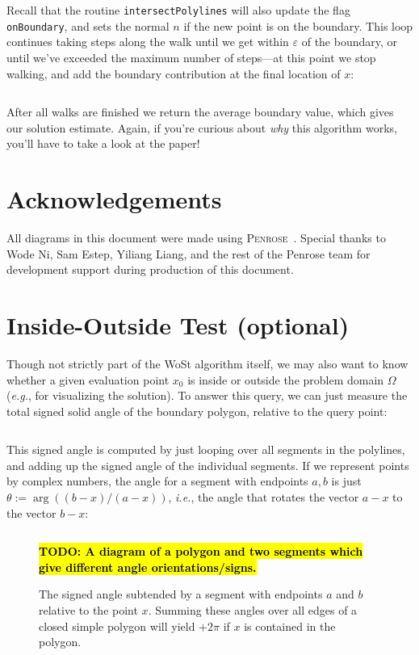 \documentclass{article}
\newcommand{\code}[1]{\texttt{\small{#1}}}
\newcommand{\todo}[1]{\textbf{\hl{TODO: #1}}}
\newcommand{\eg}{\emph{e.g.}} %
\newcommand{\ie}{\emph{i.e.}} %
\renewcommand{\vec}[1]{#1}
\begin{document}
Recall that the routine \code{intersectPolylines} will also update the flag \code{onBoundary}, and sets the normal \(\vec{n}\) if the new point is on the boundary.  This loop continues taking steps along the walk until we get within \(\varepsilon\) of the boundary, or until we've exceeded the maximum number of steps---at this point we stop walking, and add the boundary contribution at the final location of \(\vec{x}\):

\inputminted[fontsize=\small,linenos,firstline=151,lastline=159,bgcolor=bg]{cpp}{../code/WoStLaplace2D.cpp}

After all walks are finished we return the average boundary value, which gives our solution estimate.  Again, if you're curious about \emph{why} this algorithm works, you'll have to take a look at the paper!

\section*{Acknowledgements} All diagrams in this document were made using \textsc{Penrose}~\citep{Ye:2020:PFM}.  Special thanks to Wode Ni, Sam Estep, Yiliang Liang, and the rest of the Penrose team for development support during production of this document.




\appendix

\section{Inside-Outside Test (optional)}
\label{sec:InsideOutsideTest}

Though not strictly part of the WoSt algorithm itself, we may also want to know whether a given evaluation point \(\vec{x}_0\) is inside or outside the problem domain \(\Omega\) (\eg, for visualizing the solution).  To answer this query, we can just measure the total signed solid angle of the boundary polygon, relative to the query point:

\inputminted[fontsize=\small,linenos,firstline=187,lastline=198,bgcolor=bg]{cpp}{../code/WoStLaplace2D.cpp}

This signed angle is computed by just looping over all segments in the polylines, and adding up the signed angle of the individual segments.  If we represent points by complex numbers, the angle for a segment with endpoints \(\vec{a},\vec{b}\) is just \(\theta := \arg((\vec{b}-\vec{x})/(\vec{a}-\vec{x}))\), \ie, the angle that rotates the vector \(\vec{a}-\vec{x}\) to the vector \(\vec{b}-\vec{x}\):

\inputminted[fontsize=\small,linenos,firstline=176,lastline=185,bgcolor=bg]{cpp}{../code/WoStLaplace2D.cpp}

\begin{figure}[h!]
   \todo{A diagram of a polygon and two segments which give different angle orientations/signs.}
   \caption{The signed angle subtended by a segment with endpoints \(\vec{a}\) and \(\vec{b}\) relative to the point \(\vec{x}\).  Summing these angles over all edges of a closed simple polygon will yield \(+2\pi\) if \(\vec{x}\) is contained in the polygon.}
\end{figure}
\end{document}
